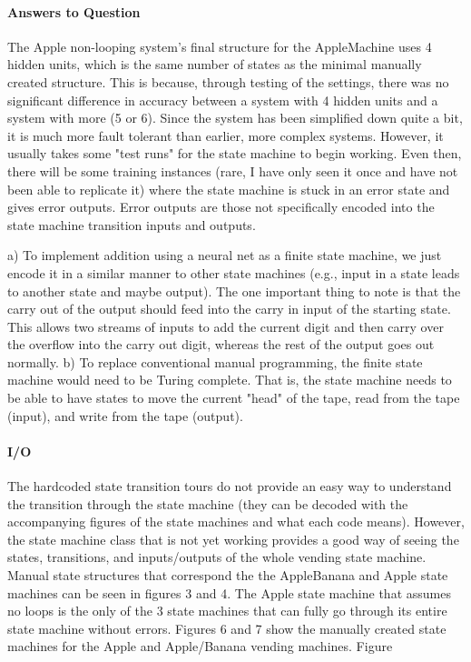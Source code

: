 \documentclass[12pt]{article}
\begin{document}
\paragraph*{Answers to Question}
The Apple non-looping system's final structure for the AppleMachine uses 4 hidden units, which is the same number of states as the minimal manually created structure. This is because, through testing of the settings, there was no significant difference in accuracy between a system with 4 hidden units and a system with more (5 or 6).
Since the system has been simplified down quite a bit, it is much more fault tolerant than earlier, more complex systems. However, it usually takes some "test runs" for the state machine to begin working. Even then, there will be some training instances (rare, I have only seen it once and have not been able to replicate it) where the state machine is stuck in an error state and gives error outputs. Error outputs are those not specifically encoded into the state machine transition inputs and outputs.

a) To implement addition using a neural net as a finite state machine, we just encode it in a similar manner to other state machines (e.g., input in a state leads to another state and maybe output). The one important thing to note is that the carry out of the output should feed into the carry in input of the starting state. This allows two streams of inputs to add the current digit and then carry over the overflow into the carry out digit, whereas the rest of the output goes out normally.
b) To replace conventional manual programming, the finite state machine would need to be Turing complete. That is, the state machine needs to be able to have states to move the current "head" of the tape, read from the tape (input), and write from the tape (output). 


\paragraph*{I/O}
The hardcoded state transition tours do not provide an easy way to understand the transition through the state machine (they can be decoded with the accompanying figures of the state machines and what each code means). However, the state machine class that is not yet working provides a good way of seeing the states, transitions, and inputs/outputs of the whole vending state machine. Manual state structures that correspond the the AppleBanana and Apple state machines can be seen in figures 3 and 4. 
The Apple state machine that assumes no loops is the only of the 3 state machines that can fully go through its entire state machine without errors.  Figures 6 and 7 show the manually created state machines for the Apple and Apple/Banana vending machines. Figure
\end{document}
